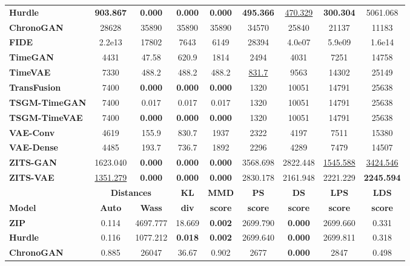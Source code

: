\documentclass[make,article,submit,moreauthors]{Definitions/mdpi}
\begin{document}
\begin{table}[htbp]
\begin{tabular}{l cccccccc}
\textbf{Hurdle}       & \textbf{903.867} & \textbf{0.000} & \textbf{0.000} & \textbf{0.000} & \textbf{495.366} & \underline{470.329} & \textbf{300.304} & 5061.068 \\
\textbf{ChronoGAN}    & 28628 & 35890 & 35890 & 35890 & 34570 & 25840 & 21137 & 11183 \\
\textbf{FIDE}         & 2.2e13 & 17802 & 7643 & 6149 & 28394 & 4.0e07 & 5.9e09 & 1.6e14 \\
\textbf{TimeGAN}      & 4431 & 47.58 & 620.9 & 1814 & 2494 & 4031 & 7251 & 14758 \\
\textbf{TimeVAE}      & 7330 & 488.2 & 488.2 & 488.2 & \underline{831.7} & 9563 & 14302 & 25149 \\
\textbf{TransFusion}  & 7400 & \textbf{0.000} & \textbf{0.000} & \textbf{0.000} & 1320 & 10051 & 14791 & 25638 \\
\textbf{TSGM-TimeGAN} & 7400 & 0.017 & 0.017 & 0.017 & 1320 & 10051 & 14791 & 25638 \\
\textbf{TSGM-TimeVAE} & 7400 & \textbf{0.000} & \textbf{0.000} & \textbf{0.000} & 1320 & 10051 & 14791 & 25638 \\
\textbf{VAE-Conv}     & 4619 & 155.9 & 830.7 & 1937 & 2322 & 4197 & 7511 & 15380 \\
\textbf{VAE-Dense}    & 4485 & 193.7 & 736.7 & 1892 & 2296 & 4289 & 7479 & 14507 \\
\textbf{ZITS-GAN}     & 1623.040 & \textbf{0.000} & \textbf{0.000} & \textbf{0.000} & 3568.698 & 2822.448 & \underline{1545.588} & \underline{3424.546} \\
\textbf{ZITS-VAE}     & \underline{1351.279} & \textbf{0.000} & \textbf{0.000} & \textbf{0.000} & 2830.178 & 2161.948 & 2221.229 & \textbf{2245.594} \\
\midrule
& \multicolumn{2}{c}{\textbf{Distances}} & \textbf{KL} & \textbf{MMD} & \textbf{PS} & \textbf{DS} & \textbf{LPS} & \textbf{LDS} \\
\cmidrule(lr){2-3}
\textbf{Model} & \textbf{Auto} & \textbf{Wass} & \textbf{div} & \textbf{score} & \textbf{score} & \textbf{score} & \textbf{score} & \textbf{score} \\
\midrule
\textbf{ZIP}          & 0.114 & 4697.777 & 18.669 & \textbf{0.002} & 2699.790 & \textbf{0.000} & 2699.660 & 0.331 \\
\textbf{Hurdle}       & 0.116 & 1077.212 & \textbf{0.018} & \textbf{0.002} & 2699.640 & \textbf{0.000} & 2699.811 & 0.318 \\
\textbf{ChronoGAN}    & 0.885 & 26047 & 36.67 & 0.902 & 2677 & \textbf{0.000} & 2847 & 0.498 \\

\end{tabular}
\end{table}
\end{document}
